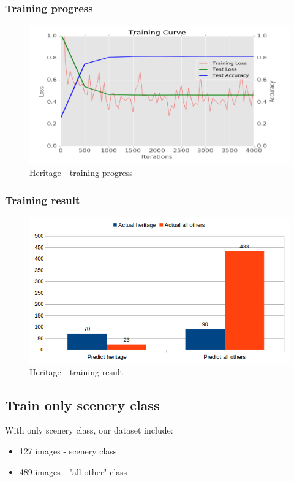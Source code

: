 \documentclass[11pt]{article}
\begin{document}
\subsubsection{Training progress}

\begin{figure}[H]
\centering
\includegraphics[width=1\textwidth]{images/train_only_heritage}
\caption{Heritage - training progress}
\end{figure}

\subsubsection{Training result}

\begin{figure}[H]
\centering
\includegraphics[width=1\textwidth]{images/heritage}
\caption{Heritage - training result}
\end{figure}

\subsection{Train only scenery class}
With only scenery class, our dataset include: 
\begin{itemize}
\item 127 images - scenery class
\item 489 images - "all other" class
\end{itemize}
\end{document}
